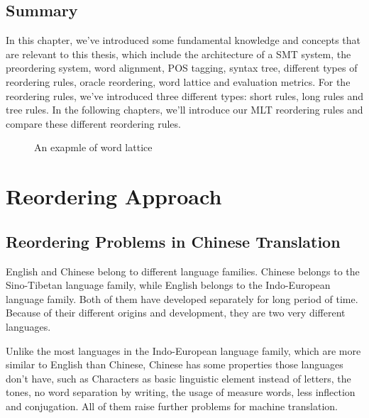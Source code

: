 \section{Summary}

In this chapter, we've introduced some fundamental knowledge and concepts that are relevant to this thesis, which include the architecture of a \ac{SMT} system, the preordering system, word alignment, \ac{POS} tagging, syntax tree, different types of reordering rules, oracle reordering, word lattice and evaluation metrics. For the reordering rules, we've introduced three different types: short rules, long rules and tree rules. In the following chapters, we'll introduce our \ac{MLT} reordering rules and compare these different reordering rules.

\begin{landscape}
\begin{figure}
\centering

\caption{An exapmle of word lattice}
\label{Lattices}
\end{figure}
\end{landscape}

\chapter{Reordering Approach}
\label{ch:ReorderingApproach}

\section{Reordering Problems in Chinese Translation}
\label{ch:ReorderingApproach:sec:Problem}

English and Chinese belong to different language families. Chinese belongs to the Sino-Tibetan language family, while English belongs to the Indo-European language family. Both of them have developed separately for long period of time. Because of their different origins and development, they are two very different languages.

Unlike the most languages in the Indo-European language family, which are more similar to English than Chinese, Chinese has some properties those languages don't have, such as Characters as basic linguistic element instead of letters, the tones, no word separation by writing, the usage of measure words, less inflection and conjugation. All of them raise further problems for machine translation.

